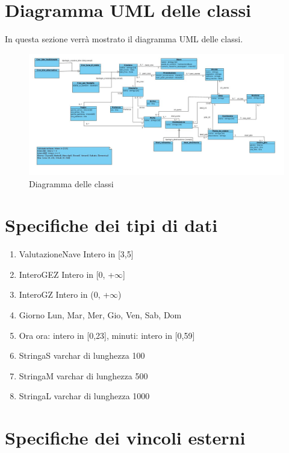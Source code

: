 \documentclass{article}
\begin{document}
\section{Diagramma UML delle classi}

In questa sezione verrà mostrato il diagramma UML delle classi.
\begin{figure}[h]
    \centering
    \includegraphics[width=\textwidth]{../Diagramma delle classi Travel To The Moon.jpg}
    \caption{Diagramma delle classi}
    \end{figure}

\section{Specifiche dei tipi di dati}

\begin{enumerate}
    \item ValutazioneNave Intero in [3,5]
    \item InteroGEZ Intero in [0, +$\infty$]
    \item InteroGZ Intero in (0, +$\infty$)
    \item Giorno {Lun, Mar, Mer, Gio, Ven, Sab, Dom}
    \item Ora {ora: intero in [0,23], minuti: intero in [0,59]}
    \item StringaS varchar di lunghezza 100
    \item StringaM varchar di lunghezza 500
    \item StringaL varchar di lunghezza 1000
\end{enumerate}



\section{Specifiche dei vincoli esterni}
\end{document}
